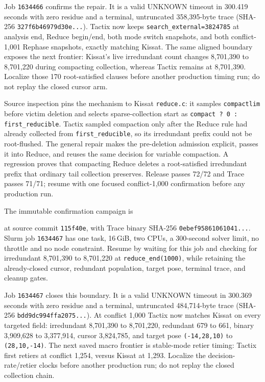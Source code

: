 \documentclass[11pt]{article}
\newcommand{\code}[1]{\texttt{#1}}
\newcommand{\artifact}[1]{\path{#1}}
\begin{document}
Job \code{1634466} confirms the repair. It is a valid UNKNOWN timeout in
300.419 seconds with zero residue and a terminal, untruncated 358,395-byte
trace (SHA-256 \code{327f6b46979d30e...}). Tactix now keeps
\code{search\_external=3824785} at analysis end, Reduce begin/end, both mode
switch snapshots, and both conflict-1,001 Rephase snapshots, exactly matching
Kissat. The same aligned boundary exposes the next frontier: Kissat's live
irredundant count changes 8,701,390 to 8,701,220 during compacting collection,
whereas Tactix remains at 8,701,390. Localize those 170 root-satisfied clauses
before another production timing run; do not replay the closed cursor arm.

Source inspection pins the mechanism to Kissat \code{reduce.c}: it samples
\code{compactlim} before victim deletion and selects sparse-collection start
as \code{compact ? 0 : first\_reducible}. Tactix sampled compaction only after
the Reduce rule had already collected from \code{first\_reducible}, so its
irredundant prefix could not be root-flushed. The general repair makes the
pre-deletion admission explicit, passes it into Reduce, and reuses the same
decision for variable compaction. A regression proves that compacting Reduce
deletes a root-satisfied irredundant prefix that ordinary tail collection
preserves. Release passes 72/72 and Trace passes 71/71; resume with one focused
conflict-1,000 confirmation before any production run.

The immutable confirmation campaign is
\begin{center}\small\artifact{20260819-0524-tierd-rank22-compact-start0}\end{center}
at source commit \code{115f40e}, with Trace binary SHA-256
\code{0ebef95861061041...}. Slurm job \code{1634467} has one task, 16\,GiB,
two CPUs, a 300-second solver limit, no throttle and no node constraint.
Resume by waiting for this job and checking for irredundant 8,701,390 to
8,701,220 at \code{reduce\_end(1000)}, while retaining the already-closed
cursor, redundant population, target pose, terminal trace, and cleanup gates.

Job \code{1634467} closes this boundary. It is a valid UNKNOWN timeout in
300.369 seconds with zero residue and a terminal, untruncated 484,714-byte
trace (SHA-256 \code{bdd9dc994ffa2075...}). At conflict 1,000 Tactix now
matches Kissat on every targeted field: irredundant 8,701,390 to 8,701,220,
redundant 679 to 661, binary 3,909,628 to 3,377,914, cursor 3,824,785, and
target pose \code{(-14,28,10)} to \code{(28,10,-14)}. The next saved macro
frontier is stable-mode retier timing: Tactix first retiers at conflict 1,254,
versus Kissat at 1,293. Localize the decision-rate/retier clocks before another
production run; do not replay the closed collection chain.
\end{document}
